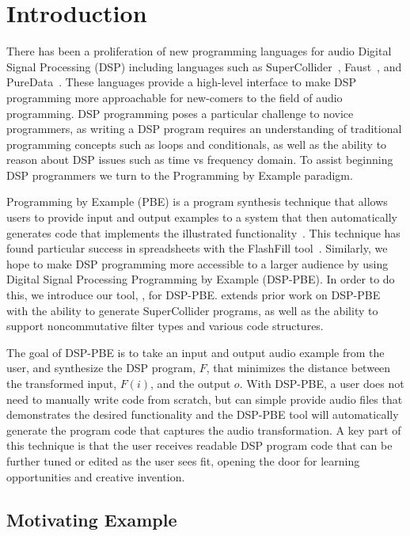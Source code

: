 
\section{Introduction}

There has been a proliferation of new programming languages for audio Digital Signal Processing (DSP) including languages such as SuperCollider~\cite{supercollider}, Faust~\cite{orlarey2009faust}, and PureData~\cite{puredata}.
These languages provide a high-level interface to make DSP programming more approachable for new-comers to the field of audio programming.
DSP programming poses a particular challenge to novice programmers, as writing a DSP program requires an understanding of traditional programming concepts such as loops and conditionals, as well as the ability to reason about DSP issues such as time vs frequency domain.
To assist beginning DSP programmers we turn to the Programming by Example paradigm.

Programming by Example (PBE) is a program synthesis technique that allows users to provide input and output examples to a system that then automatically generates code that implements the illustrated functionality~\cite{cypher93,lieberman01}.
This technique has found particular success in spreadsheets with the FlashFill tool~\cite{flashfill}.
Similarly, we hope to make DSP programming more accessible to a larger audience by using Digital Signal Processing Programming by Example (DSP-PBE).
In order to do this, we introduce our tool, \ourTool, for DSP-PBE.
\ourTool extends prior work on DSP-PBE~\cite{SantolucitoFARM} with the ability to generate SuperCollider programs, as well as the ability to support noncommutative filter types and various code structures.

The goal of DSP-PBE is to take an input and output audio example from the user, and synthesize the DSP program, $F$, that minimizes the distance between the transformed input, $F(i)$, and the output $o$.
With DSP-PBE, a user does not need to manually write code from scratch, but can simple provide audio files that demonstrates the desired functionality and the DSP-PBE tool will automatically generate the program code that captures the audio transformation.
A key part of this technique is that the user receives readable DSP program code that can be further tuned or edited as the user sees fit, opening the door for learning opportunities and creative invention.


\subsection{Motivating Example}


